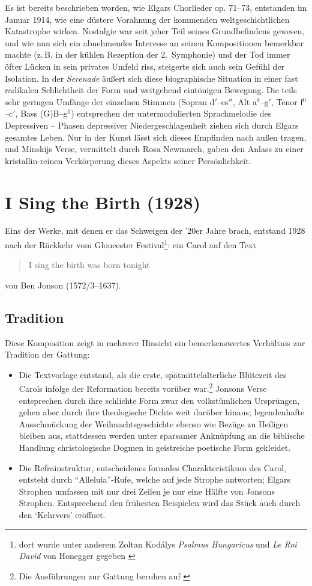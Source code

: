 \documentclass[a4paper,11pt,open=any]{scrbook}
\newcommand{\engquote}[1]{\foreignblockquote{english}{#1}}
\begin{document}
Es ist bereits beschrieben worden, wie Elgars Chorlieder op. 71–73,
entstanden im Januar 1914, wie eine düstere Vorahnung der kommenden
weltgeschichtlichen Katastrophe wirken.  Nostalgie war seit jeher Teil
seines Grundbefindens gewesen, und wie nun sich ein abnehmendes Interesse
an seinen Kompositionen bemerkbar machte (z.\,B. in der kühlen Rezeption
der 2.~Symphonie) und der Tod immer öfter Lücken in sein privates Umfeld
riss, steigerte sich auch sein Gefühl der Isolation.  In der \textit{Serenade}
äußert sich diese biographische Situation in einer fast radikalen Schlichtheit
der Form und weitgehend eintönigen Bewegung.  Die teils sehr geringen Umfänge
der einzelnen Stimmen (Sopran d$'$–es$''$, Alt a$^0$–g$'$, Tenor f$^0$–c$'$,
Bass (G)B–g$^0$) entsprechen der untermodulierten Sprachmelodie des Depressiven
– Phasen depressiver Niedergeschlagenheit ziehen sich durch Elgars gesamtes
Leben.  Nur in der Kunst lässt sich dieses Empfinden nach außen tragen, und
Minskijs Verse, vermittelt durch Rosa Newmarch, gaben den Anlass zu einer
kristallin-reinen Verkörperung dieses Aspekts seiner Persönlichkeit.

\section{I Sing the Birth \textmd{(1928)}}
Eins der Werke, mit denen er das Schweigen der ’20er Jahre brach, entstand
1928 nach der Rückkehr vom Gloucester Festival\footnote{dort wurde unter
anderem Zoltan Kodálys \textit{Psalmus Hungaricus} und \textit{Le Roi David}
von Honegger gegeben \parencite{gloucester}}: ein Carol\cite[S.~777]{moore}
auf den Text \engquote{I sing the birth was born tonight} von Ben Jonson
(1572/3–1637).

\subsection*{Tradition}
Diese Komposition zeigt in mehrerer Hinsicht ein bemerkenswertes Verhältnis
zur Tradition der Gattung:

\begin{itemize}
 \item Die Textvorlage entstand, als die erste, spätmittelalterliche Blütezeit
 des Carols infolge der Reformation bereits vorüber war.\footnote{Die
 Ausführungen zur Gattung beruhen auf \cite{carol}}  Jonsons Verse entsprechen
 durch ihre schlichte Form zwar den volkstümlichen Ursprüngen, gehen aber durch
 ihre theologische Dichte weit darüber hinaus; legendenhafte Ausschmückung der
 Weihnachtsgeschichte ebenso wie Bezüge zu Heiligen bleiben aus, stattdessen
 werden unter sparsamer Anknüpfung an die biblische Handlung christologische
 Dogmen in geistreiche poetische Form gekleidet.

 \item Die Refrainstruktur, entscheidenes formales Charakteristikum des Carol,
 entsteht durch \enquote{Alleluia}-Rufe, welche auf jede Strophe antworten;
 Elgars Strophen umfassen mit nur drei Zeilen je nur eine Hälfte von Jonsons
 Strophen.  Entsprechend den frühesten Beispielen wird das Stück auch durch den
 \enquote*{Kehrvers} eröffnet.
\end{itemize}
\end{document}
